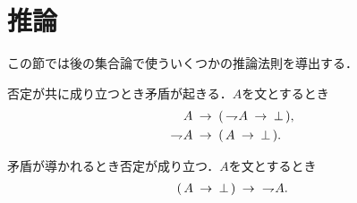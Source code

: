 \section{推論}
	この節では後の集合論で使ういくつかの推論法則を導出する．
	
	\begin{screen}
		\begin{logicalaxm}[矛盾の導入]
		\label{logicalaxm:introduction_of_contradiction}
			否定が共に成り立つとき矛盾が起きる．$A$を文とするとき
			\begin{align}
				A &\hspace{0.25em}\rightarrow\hspace{0.25em} (\, \rightharpoondown\hspace{-0.25em} A \hspace{0.25em}\rightarrow\hspace{0.25em} \bot\, ), \\
				\rightharpoondown\hspace{-0.25em} A &\hspace{0.25em}\rightarrow\hspace{0.25em} (\, A \hspace{0.25em}\rightarrow\hspace{0.25em} \bot\, ).
			\end{align}
		\end{logicalaxm}
	\end{screen}
	
	\begin{screen}
		\begin{logicalaxm}[否定の導入]
		\label{logicalaxm:introduction_of_negation}
			矛盾が導かれるとき否定が成り立つ．$A$を文とするとき
			\begin{align}
				(\, A \hspace{0.25em}\rightarrow\hspace{0.25em} \bot\, ) \hspace{0.25em}\rightarrow\hspace{0.25em}\ \rightharpoondown\hspace{-0.25em} A.
			\end{align}
		\end{logicalaxm}
	\end{screen}
	
